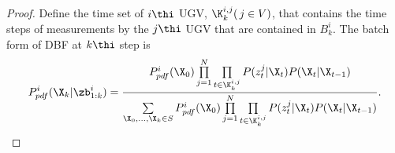 	\begin{proof}	
		Define the time set of $i\thi$ UGV, $\K^{i,j}_{k}(\,j\in V)$, that contains the time steps of measurements by the $j\thi$ UGV that are contained in $B^i_k$.
		The batch form of DBF at $k\thi$ step is
		\small\begin{equation*}
			P^i_{pdf}(\X_k|\zb^i_{1:k})=\frac{P^i_{pdf}(\X_0)\prod\limits_{j=1}^{N}\prod\limits_{t\in\K^{i,j}_{k}}P(z^j_t|\X_t)P(\X_t|\X_{t-1})}{\sum\limits_{\X_0,\dots,\X_k\in S}P^i_{pdf}(\X_0)\prod\limits_{j=1}^{N}\prod\limits_{t\in\K^{i,j}_{k}}P(z^j_t|\X_t)P(\X_t|\X_{t-1})}.
		\end{equation*}\normalsize

		
		

\end{proof}
